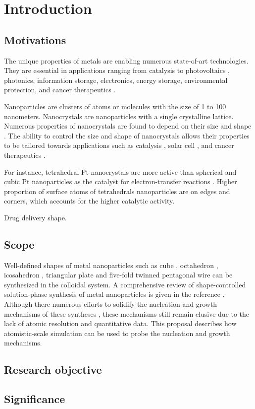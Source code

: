 \section{Introduction}

\subsection{Motivations}

The unique properties of metals are enabling numerous state-of-art technologies.
They are essential in applications ranging from catalysis \cite{astruc2008nanoparticles,Astruc_2006} to photovoltaics \cite{Atwater_2010}, photonics, information storage, electronics, energy storage, environmental protection, and cancer therapeutics \cite{Jain_2010,Kim_2010}.


Nanoparticles are clusters of atoms or molecules with the size of 1 to 100 nanometers. 
Nanocrystals are nanoparticles with a single crystalline lattice. 
Numerous properties of nanocrystals are found to depend on their size \cite{Roduner_2006} and shape \cite{Xia_2008}. 
The ability to control the size and shape of nanocrystals allows their properties to be tailored towards applications such as catalysis \cite{astruc2008nanoparticles,Astruc_2006}, solar cell \cite{Atwater_2010}, and cancer therapeutics \cite{Jain_2010,Kim_2010}. 

For instance, tetrahedral Pt nanocrystals are more active than spherical and cubic Pt nanoparticles as the catalyst for electron-transfer reactions \cite{Narayanan_2005}. Higher proportion of surface atoms of tetrahedrals nanoparticles are on edges and corners, which accounts for the higher catalytic activity. 

Drug delivery shape.

\subsection{Scope}

Well-defined shapes of metal nanoparticles such as cube \cite{Im_2005}, octahedron \cite{Xia_2012}, icosahedron \cite{Xiong_2007}, triangular plate \cite{Lofton_2005} and five-fold twinned pentagonal wire \cite{Tsuji_2008} can be synthesized in the colloidal system. A comprehensive review of shape-controlled solution-phase synthesis of metal nanoparticles is given in the reference \cite{Xia_2008}. Although there numerous efforts to solidify the nucleation and growth mechanisms of these syntheses \cite{Lofton_2005,Mariscal_2012,Park_2013,Viswanath_2009,Liao_2014,Chang_2011,Murph_2015}, these mechanisms still remain elusive due to the lack of atomic resolution and quantitative data. This proposal describes how atomistic-scale simulation can be used to probe the nucleation and growth mechanisms.

\subsection{Research objective}

\subsection{Significance}
    